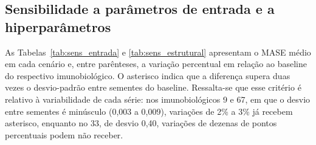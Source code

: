 \documentclass[
    12pt,
    openright,
    oneside,
    a4paper,
    english,
    brazil
]{abntex2}
\begin{document}
\subsection{Sensibilidade a parâmetros de entrada e a hiperparâmetros}
\label{sec:res_sensibilidade}

As Tabelas~\ref{tab:sens_entrada} e \ref{tab:sens_estrutural} apresentam o MASE médio em cada cenário e, entre parênteses, a variação percentual em relação ao baseline do respectivo imunobiológico. O asterisco indica que a diferença supera duas vezes o desvio-padrão entre sementes do baseline. Ressalta-se que esse critério é relativo à variabilidade de cada série: nos imunobiológicos 9 e 67, em que o desvio entre sementes é minúsculo (0,003 a 0,009), variações de 2\% a 3\% já recebem asterisco, enquanto no 33, de desvio 0,40, variações de dezenas de pontos percentuais podem não receber.
\end{document}
